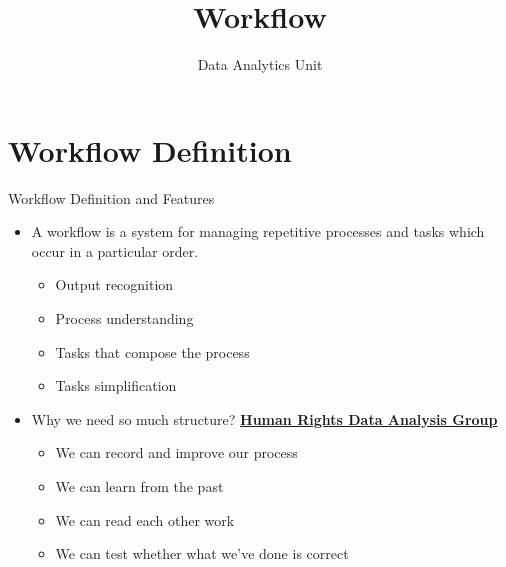 \documentclass[
  ignorenonframetext,
]{beamer}
\title{Workflow}
\author{Data Analytics Unit}
\date{}
\providecommand{\tightlist}{%
  \setlength{\itemsep}{0pt}\setlength{\parskip}{0pt}}\usepackage{longtable,booktabs,array}
\begin{document}
\frame{\titlepage}
\ifdefined\Shaded\renewenvironment{Shaded}{\begin{tcolorbox}[frame hidden, boxrule=0pt, enhanced, sharp corners, borderline west={3pt}{0pt}{shadecolor}, breakable, interior hidden]}{\end{tcolorbox}}\fi

\hypertarget{workflow-definition}{%
\section{Workflow Definition}\label{workflow-definition}}

\begin{frame}{Workflow Definition and Features}
\protect\hypertarget{workflow-definition-and-features}{}
\begin{itemize}
\item
  A workflow is a system for managing repetitive processes and tasks
  which occur in a particular order.

  \begin{itemize}
  \tightlist
  \item
    Output recognition
  \item
    Process understanding
  \item
    Tasks that compose the process
  \item
    Tasks simplification
  \end{itemize}
\item
  Why we need so much structure?
  \href{https://hrdag.org/2016/06/14/the-task-is-a-quantum-of-workflow/}{\textbf{Human
  Rights Data Analysis Group}}

  \begin{itemize}
  \tightlist
  \item
    We can record and improve our process
  \item
    We can learn from the past
  \item
    We can read each other work
  \item
    We can test whether what we've done is correct
  \end{itemize}
\end{itemize}
\end{frame}
\end{document}
